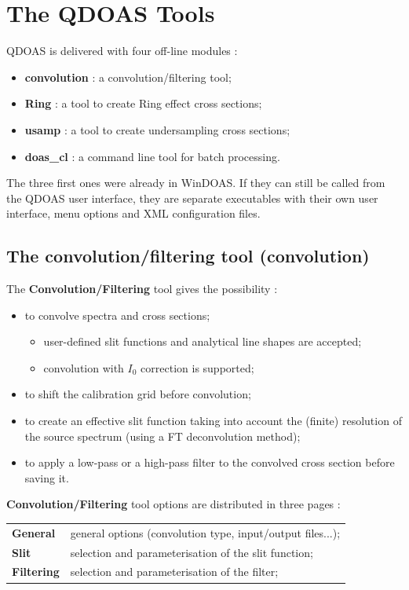 \chapter{The QDOAS Tools} \label{cha:tools}
QDOAS is delivered with four off-line modules :

\begin{itemize} \itemsep -6pt
\item \textbf{convolution} : a convolution/filtering tool;
\item \textbf{Ring} : a tool to create Ring effect cross sections;
\item \textbf{usamp} : a tool to create undersampling cross sections;
\item \textbf{doas\_cl} : a command line tool for batch processing.
\end{itemize}

The three first ones were already in WinDOAS. If they can still be called from
the QDOAS user interface, they are separate executables with their own user
interface, menu options and XML configuration files.

\section{The convolution/filtering tool (convolution)}\label{sec:conv-tool}

The \textbf{Convolution/Filtering} tool gives the possibility :

\begin{itemize}
\item to convolve spectra and cross sections;

\begin{itemize} \itemsep -6pt
\item user-defined slit functions and analytical line shapes are accepted;
\item convolution with $I_0$ correction is supported;
\end{itemize}

\item to shift the calibration grid before convolution;
\item to create an effective slit function taking into account the (finite) resolution
of the source spectrum (using a FT deconvolution method);
\item to apply a low-pass or a high-pass filter to the convolved cross section
before saving it.
\end{itemize}

\textbf{Convolution/Filtering} tool options are distributed in three pages :
\vskip 6pt
\begin{tabular}[h]{l p{8cm}}
\textbf{General} & general options (convolution type, input/output files...); \\ [6pt]
\textbf{Slit} & selection and parameterisation of the slit function; \\ [6pt]
\textbf{Filtering} & selection and parameterisation of the filter; \\ [6pt]
\end{tabular}

